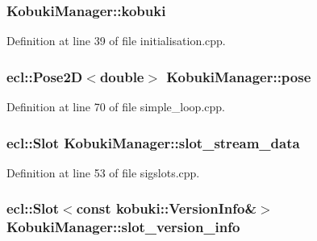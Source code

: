 \subsubsection[{kobuki}]{ {\bf \-Kobuki\-Manager\-::kobuki}\hspace{0.3cm}{\ttfamily  [private]}}\label{classKobukiManager_aedbd8a41454f86c36938b15481688d4c}


\-Definition at line 39 of file initialisation.\-cpp.

\subsubsection[{pose}]{\setlength{\rightskip}{0pt plus 5cm}ecl\-::\-Pose2\-D$<$double$>$ {\bf \-Kobuki\-Manager\-::pose}\hspace{0.3cm}{\ttfamily  [private]}}\label{classKobukiManager_ad0ed629496ed8578df47bd15d4a1b3f6}


\-Definition at line 70 of file simple\-\_\-loop.\-cpp.

\subsubsection[{slot\-\_\-stream\-\_\-data}]{\setlength{\rightskip}{0pt plus 5cm}ecl\-::\-Slot {\bf \-Kobuki\-Manager\-::slot\-\_\-stream\-\_\-data}\hspace{0.3cm}{\ttfamily  [private]}}\label{classKobukiManager_a932be6e61aa406bc1a33c12281bc4499}


\-Definition at line 53 of file sigslots.\-cpp.

\subsubsection[{slot\-\_\-version\-\_\-info}]{\setlength{\rightskip}{0pt plus 5cm}ecl\-::\-Slot$<$const {\bf kobuki\-::\-Version\-Info}\&$>$ {\bf \-Kobuki\-Manager\-::slot\-\_\-version\-\_\-info}\hspace{0.3cm}{\ttfamily  [private]}}\label{classKobukiManager_a3e2ed71aaa1c0bd70840322114076169}


